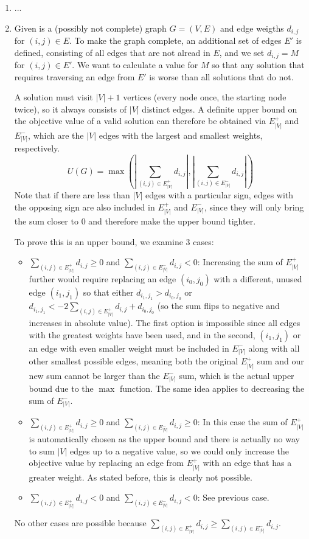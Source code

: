 \documentclass{scrartcl}
\begin{document}
	\begin{enumerate}
		\item ...
		\item Given is a (possibly not complete) graph $G=(V,E)$ and edge weigths $d_{i,j}$ for $(i,j) \in E$. To make the graph complete, an additional set of edges $E'$ is defined, consisting of all edges that are not alread in $E$, and we set $d_{i,j} = M$ for $(i,j) \in E'$. We want to calculate a value for $M$ so that any solution that requires traversing an edge from $E'$ is worse than all solutions that do not.
		
		A solution must visit $|V| + 1$ vertices (every node once, the starting node twice), so it always consists of $|V|$ distinct edges. A definite upper bound on the objective value of a valid solution can therefore be obtained via $E_{|V|}^+$ and $E_{|V|}^-$, which are the $|V|$ edges with the largest and smallest weights, respectively.
		\[ U(G) = \max\left( \left| \sum_{(i,j) \in E_{|V|}^+}{d_{i,j}} \right|, \left| \sum_{(i,j) \in E_{|V|}^-}{d_{i,j}} \right| \right) \]
		Note that if there are less than $|V|$ edges with a particular sign, edges with the opposing sign are also included in $E_{|V|}^+$ and $E_{|V|}^-$, since they will only bring the sum closer to 0 and therefore make the upper bound tighter.
		
		To prove this is an upper bound, we examine 3 cases:
		\begin{itemize}
			\item $\sum_{(i,j) \in E_{|V|}^+}{d_{i,j}} \ge 0$ and $\sum_{(i,j) \in E_{|V|}^-}{d_{i,j}} < 0$: Increasing the sum of $E_{|V|}^+$ further would require replacing an edge $(i_0, j_0)$ with a different, unused edge $(i_1,j_1)$ so that either $d_{i_1,j_1} > d_{i_0,j_0}$ or $d_{i_1,j_1} < -2\sum_{(i,j) \in E_{|V|}^+}{d_{i,j}} + d_{i_0,j_0}$ (so the sum flips to negative and increases in absolute value). The first option is impossible since all edges with the greatest weights have been used, and in the second, $(i_1,j_1)$ or an edge with even smaller weight must be included in $E_{|V|}^-$ along with all other smallest possible edges, meaning both the original $E_{|V|}^+$ sum and our new sum cannot be larger than the $E_{|V|}^-$ sum, which is the actual upper bound due to the $\max$ function. The same idea applies to decreasing the sum of $E_{|V|}^-$.
			\item $\sum_{(i,j) \in E_{|V|}^+}{d_{i,j}} \ge 0$ and $\sum_{(i,j) \in E_{|V|}^-}{d_{i,j}} \ge 0$: In this case the sum of $E_{|V|}^+$ is automatically chosen as the upper bound and there is actually no way to sum $|V|$ edges up to a negative value, so we could only increase the objective value by replacing an edge from $E_{|V|}^+$ with an edge that has a greater weight. As stated before, this is clearly not possible.
			\item $\sum_{(i,j) \in E_{|V|}^+}{d_{i,j}} < 0$ and $\sum_{(i,j) \in E_{|V|}^-}{d_{i,j}} < 0$: See previous case.
		\end{itemize}
		No other cases are possible because $\sum_{(i,j) \in E_{|V|}^+}{d_{i,j}} \ge \sum_{(i,j) \in E_{|V|}^-}{d_{i,j}}$.
		

\end{enumerate}
\end{document}
